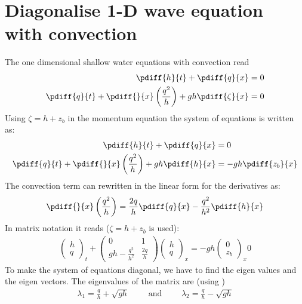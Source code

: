 \chapter{Diagonalise 1-D wave equation with convection}\label{sec:diagonalise_conservative_wave_with_convection}

The one dimensional shallow water equations  with convection
read
%
\begin{align}
    \pdiff{h}{t}  + \pdiff{q}{x} & = 0 \label{eq:continuity_for_diagonalisation}\\
    \pdiff{q}{t}  + \pdiff{}{x} \left( \frac{q^2}{h} \right) + g h \pdiff{\zeta}{x} & = 0 \label{eq:momentum_for_diagonalisation}
\end{align}
Using $\zeta = h + z_b$ in the momentum equation the system of equations is written as:
\begin{align}
    \pdiff{h}{t}  + \pdiff{q}{x} & = 0
    \\
    \pdiff{q}{t}  + \pdiff{}{x} \left( \frac{q^2}{h} \right) + g h \pdiff{h}{x} & = -gh\pdiff{z_b}{x}
\end{align}
The convection term can rewritten in the linear form for the derivatives as:
\begin{align}
    \pdiff{}{x} \left( \frac{q^2}{h} \right) = \frac{2 q}{h} \pdiff{q}{x} - \frac{q^2}{h^2}\pdiff{h}{x}
    \label{eq:convection_linear_form}
\end{align}
In matrix notation it reads ($\zeta = h +z_b$ is used):
\begin{align}
    \begin{pmatrix} h \\ q \end{pmatrix}_t +
    \begin{pmatrix} 0 & 1  \\ gh-\frac{q^2}{h^2} & \frac{2q}{h} \end{pmatrix}
    \begin{pmatrix} h \\ q \end{pmatrix}_x =
    -gh \begin{pmatrix} 0 \\ z_b \end{pmatrix}_x
    0
\end{align}
To make the system of equations diagonal, we have to find the eigen values and the eigen vectors.
The eigenvalues of the matrix are (using \maplesoft)
\begin{align}
    \lambda_1 = \frac{q}{h} + \sqrt{gh} \qquad \mbox{ and } \qquad
    \lambda_2 = \frac{q}{h} - \sqrt{gh}
\end{align}
